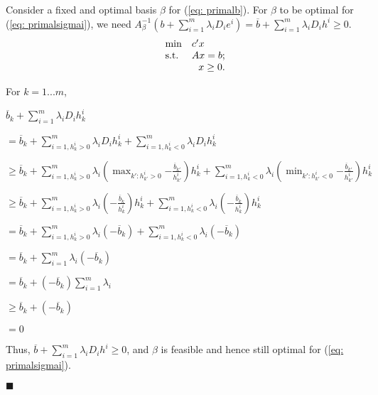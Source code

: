 Consider a fixed and optimal basis $\beta$ for (\ref{eq: primalb}). For $\beta$ to be optimal for (\ref{eq: primalsigmai}), we need $A^{-1}_{\beta}(b+\sum^{m}_{i=1}\lambda_i{}D_i{}e^i)=\overline{b}+\sum^{m}_{i=1}\lambda_i{}D_i{}h^i\geq0$.
\begin{equation}
\label{eq: primalb}
  \begin{array}{lrcll}
    \min
    & \multicolumn{4}{l}{c'x} \\
    \text{s.t.}
    & Ax=b;\\
    & x\geq0.
  \end{array}
\end{equation}

For $k=1...m$,

$\overline{b}_k+\sum^{m}_{i=1}\lambda_i{}D_i{}h^i_k$

$=\overline{b}_k+\sum^{m}_{i=1,h^i_k>0}\lambda_i{}D_i{}h^i_k+\sum^{m}_{i=1,h^i_k<0}\lambda_i{}D_i{}h^i_k$

$\geq{}\overline{b}_k+\sum^{m}_{i=1,h^i_k>0}\lambda_i{}(\max_{k':h^i_{k'}>0}{-\frac{\overline{b}_{k'}}{h^i_{k'}}})h^i_k+\sum^{m}_{i=1,h^i_k<0}\lambda_i{}(\min_{k':h^i_{k'}<0}{-\frac{\overline{b}_{k'}}{h^i_{k'}}})h^i_k$

$\geq{}\overline{b}_k+\sum^{m}_{i=1,h^i_k>0}\lambda_i{}(-\frac{\overline{b}_k}{h^i_k})h^i_k+\sum^{m}_{i=1,h^i_k<0}\lambda_i{}(-\frac{\overline{b}_k}{h^i_k})h^i_k$

$=\overline{b}_k+\sum^{m}_{i=1,h^i_k>0}\lambda_i{}(-\overline{b}_k)+\sum^{m}_{i=1,h^i_k<0}\lambda_i{}(-\overline{b}_k)$

$=\overline{b}_k+\sum^{m}_{i=1}\lambda_i{}(-\overline{b}_k)$

$=\overline{b}_k+(-\overline{b}_k)\sum^{m}_{i=1}\lambda_i{}$

$\geq\overline{b}_k+(-\overline{b}_k)$

$=0$

Thus, $\overline{b}+\sum^{m}_{i=1}\lambda_i{}D_i{}h^i\geq0$, and $\beta$ is feasible and hence still optimal for (\ref{eq: primalsigmai}).
\begin{flushright} $\blacksquare$ \end{flushright}